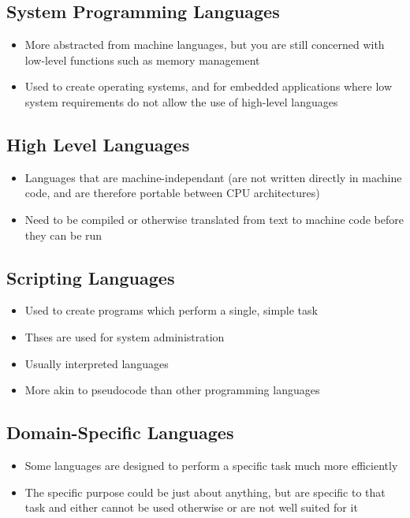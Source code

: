 \subsection*{System Programming Languages}

\begin{itemize}
  \item More abstracted from machine languages, but you are still concerned with low-level functions such as memory
   management
  \item Used to create operating systems, and for embedded applications where low system requirements do not allow
  the use of high-level languages
\end{itemize}

\subsection*{High Level Languages}

\begin{itemize}
  \item Languages that are machine-independant (are not written directly in machine code, and are therefore portable
  between CPU architectures)
  \item Need to be compiled or otherwise translated from text to machine code before they can be run
\end{itemize}

\subsection*{Scripting Languages}

\begin{itemize}
  \item Used to create programs which perform a single, simple task
  \item Thses are used for system administration
  \item Usually interpreted languages
  \item More akin to pseudocode than other programming languages
\end{itemize}

\subsection*{Domain-Specific Languages}

\begin{itemize}
  \item Some languages are designed to perform a specific task much more efficiently
  \item The specific purpose could be just about anything, but are specific to that task and either cannot be used
   otherwise
  or are not well suited for it
\end{itemize}

